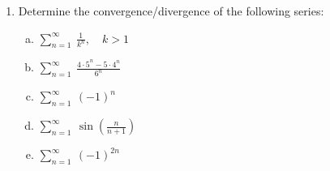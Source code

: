 \begin{enumerate}

\item Determine the convergence/divergence of the following series: \label{prob3}
\begin{enumerate}[a)]

\item \(\sum_{n=1}^\infty \ \frac{1}{k^n}, \quad k>1\)\vfill

\item \(\sum_{n=1}^\infty \ \frac{4\cdot 5^n - 5\cdot 4^n}{6^n}\)\vfill

\item \(\sum_{n=1}^\infty \ (-1)^n\)\vfill

\item \(\sum_{n=1}^\infty \ \sin\left(\frac{n}{n+1}\right)\)\vfill

\item \(\sum_{n=1}^\infty \ (-1)^{2n}\)\vfill


\end{enumerate}


%
%
%
%
%
%


\end{enumerate}

\vfill



